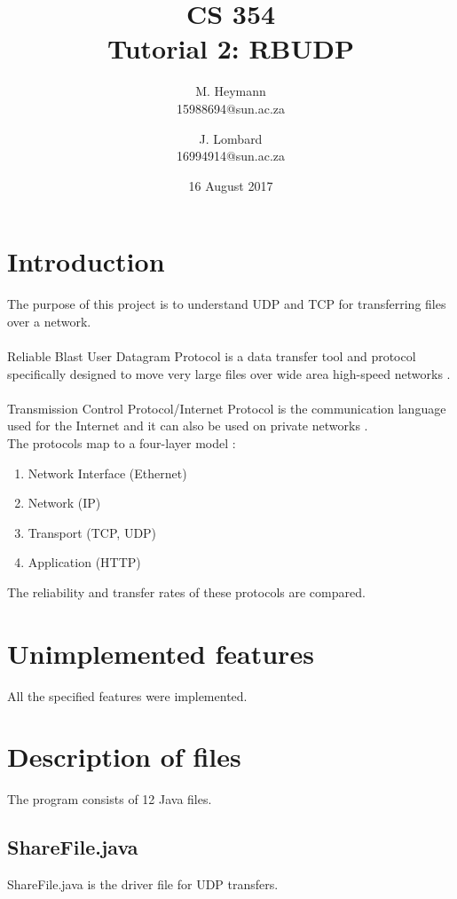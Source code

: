 \documentclass[a4paper,10pt]{article}
\title{CS 354\\Tutorial 2: RBUDP}
\author{M. Heymann\\15988694@sun.ac.za \and J. Lombard\\16994914@sun.ac.za}
\date{16 August 2017}
\begin{document}
\clearpage\maketitle
\thispagestyle{empty} %

\pagebreak

\clearpage\tableofcontents
\thispagestyle{empty}

\pagebreak
\setcounter{page}{1} %

\section{Introduction}
The purpose of this project is to understand UDP and TCP for transferring files
over a network.\\\\
Reliable Blast User Datagram Protocol is a data transfer tool and protocol
specifically designed to move very large files over wide area high-speed
networks \cite{udpDef}.\\\\
Transmission Control Protocol/Internet Protocol is the communication language
used for the Internet and it can also be used on private networks
\cite{tcpDef}.\\
The protocols map to a four-layer model \cite{map}:
\begin{enumerate}
	\item Network Interface (Ethernet)
	\item Network (IP)
	\item Transport (TCP, UDP)
	\item Application (HTTP)
\end{enumerate}
The reliability and transfer rates of these protocols are compared.

\section{Unimplemented features}
All the specified features were implemented.

\section{Description of files}
The program consists of 12 Java files.

\subsection{ShareFile.java}
ShareFile.java is the driver file for UDP transfers.
\end{document}

